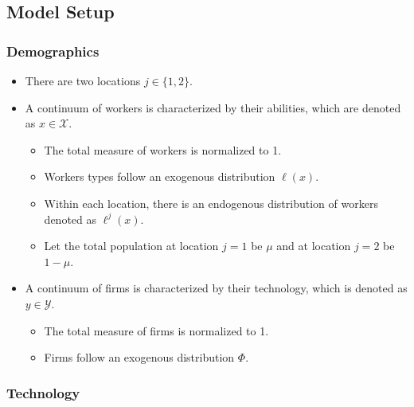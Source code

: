 \documentclass[
  letterpaper,
  DIV=11,
  numbers=noendperiod]{scrartcl}
\author{}
\date{}
\providecommand{\tightlist}{%
  \setlength{\itemsep}{0pt}\setlength{\parskip}{0pt}}\usepackage{longtable,booktabs,array}
\begin{document}
\ifdefined\Shaded\renewenvironment{Shaded}{\begin{tcolorbox}[sharp corners, interior hidden, breakable, enhanced, frame hidden, boxrule=0pt, borderline west={3pt}{0pt}{shadecolor}]}{\end{tcolorbox}}\fi

\hypertarget{model-setup}{%
\subsection{Model Setup}\label{model-setup}}

\hypertarget{demographics}{%
\subsubsection{Demographics}\label{demographics}}

\begin{itemize}
\tightlist
\item
  There are two locations \(j\in\{1,2\}\).
\item
  A continuum of workers is characterized by their abilities, which are
  denoted as \(x \in \mathcal{X}\).

  \begin{itemize}
  \tightlist
  \item
    The total measure of workers is normalized to 1.
  \item
    Workers types follow an exogenous distribution \(\ell(x)\).
  \item
    Within each location, there is an endogenous distribution of workers
    denoted as \(\ell^{j}(x)\).
  \item
    Let the total population at location \(j=1\) be \(\mu\) and at
    location \(j=2\) be \(1-\mu\).
  \end{itemize}
\item
  A continuum of firms is characterized by their technology, which is
  denoted as \(y \in \mathcal{Y}\).

  \begin{itemize}
  \tightlist
  \item
    The total measure of firms is normalized to 1.
  \item
    Firms follow an exogenous distribution \(\Phi\).
  \end{itemize}
\end{itemize}

\hypertarget{technology}{%
\subsubsection{Technology}\label{technology}}
\end{document}
